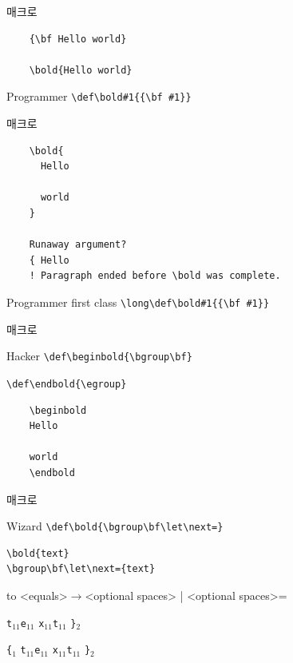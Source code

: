 \documentclass{beamer}
\begin{document}
%
\begin{frame}[fragile]{\texttt{\string\bold} 매크로}
\begin{verbatim}
    {\bf Hello world}
    
    \bold{Hello world}
\end{verbatim}
  \begin{alertblock}{Programmer}
    \verb+\def\bold#1{{\bf #1}}+
  \end{alertblock}
\end{frame}


%
\begin{frame}[fragile]{\texttt{\string\bold} 매크로}
\begin{verbatim}
    \bold{
      Hello

      world
    }

    Runaway argument?
    { Hello
    ! Paragraph ended before \bold was complete.
\end{verbatim}
  \begin{alertblock}{Programmer first class}
    \verb+\long\def\bold#1{{\bf #1}}+
  \end{alertblock}
\end{frame}


%
\begin{frame}[fragile]{\texttt{\string\bold} 매크로}
  \begin{alertblock}{Hacker}
    \verb+\def\beginbold{\bgroup\bf}+
    
    \verb+\def\endbold{\egroup}+
  \end{alertblock}

\begin{verbatim}
    \beginbold
    Hello

    world
    \endbold
\end{verbatim}
\end{frame}


%
\begin{frame}[fragile]{\texttt{\string\bold} 매크로}
  \begin{alertblock}{Wizard}
    \verb+\def\bold{\bgroup\bf\let\next=}+
  \end{alertblock}

\begin{verbatim}
\bold{text}
\bgroup\bf\let\next={text}
\end{verbatim}

  \hbox to
  <equals>$\rightarrow$<optional spaces> | <optional spaces>=

\bigskip

  \quad{}\quad
  \verb|t|$_{11}$\quad\verb|e|$_{11}$\quad
  \verb|x|$_{11}$\quad\verb|t|$_{11}$\quad
  \verb|}|$_{2}$

  \verb|{|$_1$\quad{}\quad
  \verb|t|$_{11}$\quad\verb|e|$_{11}$\quad
  \verb|x|$_{11}$\quad\verb|t|$_{11}$\quad
  \verb|}|$_{2}$
\end{frame}
\end{document}
